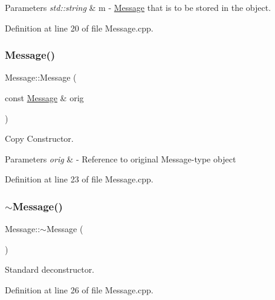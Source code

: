 \begin{DoxyParams}{Parameters}
{\em std\+::string} & m -\/ \mbox{\hyperlink{classMessage}{Message}} that is to be stored in the object. \\
\hline
\end{DoxyParams}


Definition at line 20 of file Message.\+cpp.

\mbox{\label{classMessage_afc0cbea76e5ed74d86af6b6646fd8642}} 
\subsubsection{\texorpdfstring{Message()}{Message()}\hspace{0.1cm}{\footnotesize\ttfamily [3/3]}}
{\footnotesize\ttfamily Message\+::\+Message (\begin{DoxyParamCaption}\item[{const \mbox{\hyperlink{classMessage}{Message}} \&}]{orig }\end{DoxyParamCaption})}



Copy Constructor. 


\begin{DoxyParams}{Parameters}
{\em orig} & -\/ Reference to original Message-\/type object \\
\hline
\end{DoxyParams}


Definition at line 23 of file Message.\+cpp.

\mbox{\label{classMessage_a3f7275462831f787a861271687bcad67}} 
\subsubsection{\texorpdfstring{$\sim$Message()}{~Message()}}
{\footnotesize\ttfamily Message\+::$\sim$\+Message (\begin{DoxyParamCaption}{ }\end{DoxyParamCaption})\hspace{0.3cm}{\ttfamily [virtual]}}

Standard deconstructor. 

Definition at line 26 of file Message.\+cpp.



